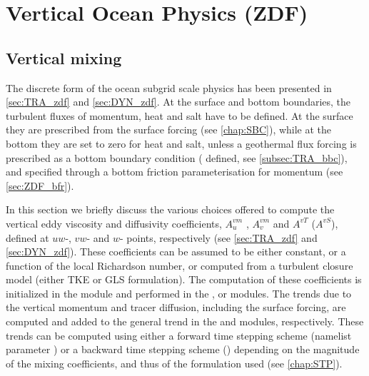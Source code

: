 \documentclass[../main/NEMO_manual]{subfiles}
\begin{document}
\chapter{Vertical Ocean Physics (ZDF)}
\label{chap:ZDF}

\minitoc


\newpage

\section{Vertical mixing}
\label{sec:ZDF_zdf}

The discrete form of the ocean subgrid scale physics has been presented in
\autoref{sec:TRA_zdf} and \autoref{sec:DYN_zdf}.
At the surface and bottom boundaries, the turbulent fluxes of momentum, heat and salt have to be defined.
At the surface they are prescribed from the surface forcing (see \autoref{chap:SBC}),
while at the bottom they are set to zero for heat and salt,
unless a geothermal flux forcing is prescribed as a bottom boundary condition (\ie {} defined,
see \autoref{subsec:TRA_bbc}), and specified through a bottom friction parameterisation for momentum
(see \autoref{sec:ZDF_bfr}).

In this section we briefly discuss the various choices offered to compute the vertical eddy viscosity and
diffusivity coefficients, $A_u^{vm}$ , $A_v^{vm}$ and $A^{vT}$ ($A^{vS}$), defined at $uw$-, $vw$- and $w$- points,
respectively (see \autoref{sec:TRA_zdf} and \autoref{sec:DYN_zdf}).
These coefficients can be assumed to be either constant, or a function of the local Richardson number,
or computed from a turbulent closure model (either TKE or GLS formulation).
The computation of these coefficients is initialized in the  module and performed in
the ,  or  modules.
The trends due to the vertical momentum and tracer diffusion, including the surface forcing,
are computed and added to the general trend in the  and  modules, respectively. 
These trends can be computed using either a forward time stepping scheme
(namelist parameter ) or a backward time stepping scheme
() depending on the magnitude of the mixing coefficients,
and thus of the formulation used (see \autoref{chap:STP}).
\end{document}
